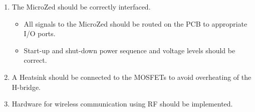 \begin{enumerate}[resume]
	\item The MicroZed should be correctly interfaced.
	\label{enum:microzed_interface}
	\begin{itemize}
		\item All signals to the MicroZed should be routed on the PCB to appropriate I/O ports.
		\item Start-up and shut-down power sequence and voltage levels should be correct.
	\end{itemize}
	\item A Heatsink should be connected to the MOSFETs to avoid overheating of the H-bridge.
	\label{enum:cool_mosfets}
	\item Hardware for wireless communication using RF should be implemented.
	\label{enum:hardware_for_wireless_implemented}
\end{enumerate}


